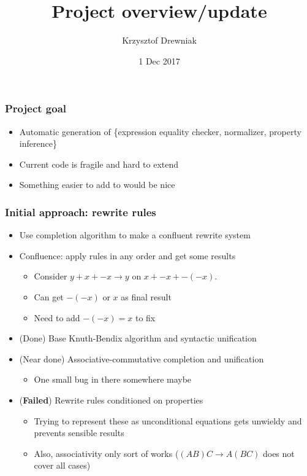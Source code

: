 \documentclass{beamer}
\title[]{Project overview/update}
\author[]{Krzysztof Drewniak}
\institute[]{HPAC}
\date[]{1 Dec 2017}
\begin{document}
\begin{frame}[plain]
\titlepage{}
\end{frame}

\begin{frame}
  \frametitle{Project goal}
  \begin{itemize}
  \item Automatic generation of \{expression equality checker, normalizer, property inference\}
  \item Current code is fragile and hard to extend
  \item Something easier to add to would be nice
  \end{itemize}
\end{frame}

\begin{frame}
  \frametitle{Initial approach: rewrite rules}
  \begin{itemize}
  \item Use completion algorithm to make a confluent rewrite system
  \item Confluence: apply rules in any order and get some results
    \begin{itemize}
    \item Consider $y + x + -x \to y$ on $x + -x + -(-x)$.
    \item Can get $-(-x)$ or $x$ as final result
    \item Need to add $-(-x) = x$ to fix
    \end{itemize}
  \item (Done) Base Knuth-Bendix algorithm and syntactic unification
  \item (Near done) Associative-commutative completion and unification
    \begin{itemize}
    \item One small bug in there somewhere maybe
    \end{itemize}
  \item (\textbf{Failed}) Rewrite rules conditioned on properties
    \begin{itemize}
    \item Trying to represent these as unconditional equations gets unwieldy and prevents sensible results
    \item Also, associativity only sort of works ($(AB)C \to A(BC)$ does not cover all cases)
    \end{itemize}
  \end{itemize}
\end{frame}
\end{document}
